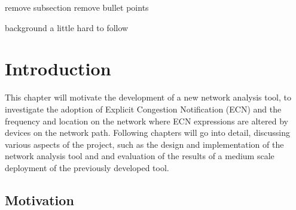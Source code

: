 \documentclass{l4proj}
\begin{document}
%
%
%
%
%
%
%
remove subsection
remove bullet points

background a little hard to follow

\chapter{Introduction}
\label{chap:introduction}


This chapter will motivate the development of a new network analysis tool, to investigate the adoption of Explicit Congestion Notification (ECN) and the frequency and location on the network where ECN expressions are altered by devices on the network path. Following chapters will go into detail, discussing various aspects of the project, such as the design and implementation of the network analysis tool and and evaluation of the results of a medium scale deployment of the previously developed tool.

\section{Motivation}
\end{document}
